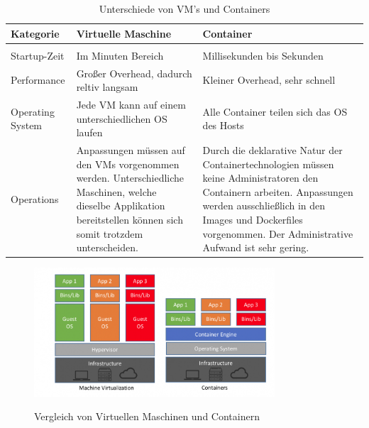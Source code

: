 \begin{table}[h]
        \centering
        \begin{tabular}{ | p{} | p{} | p{} | }
        Kategorie & Virtuelle Maschine & Container \\
        \hline \\
        Startup-Zeit & Im Minuten Bereich & Millisekunden bis Sekunden \\
        Performance & Großer Overhead, dadurch reltiv langsam & Kleiner Overhead, sehr schnell\\
        Operating System & Jede \ac{VM} kann auf einem unterschiedlichen \ac{OS} laufen & Alle Container teilen sich das \ac{OS} des Hosts \\
        Operations & Anpassungen müssen auf den \ac{VM}s vorgenommen werden. Unterschiedliche Maschinen, welche dieselbe Applikation bereitstellen können sich somit trotzdem unterscheiden. & Durch die deklarative Natur der Containertechnologien müssen keine Administratoren den Containern arbeiten. Anpassungen werden ausschließlich in den Images und Dockerfiles vorgenommen. Der Administrative Aufwand ist sehr gering. \\
        \end{tabular}
        \caption{Unterschiede von VM's und Containers}
        \label{table:comparison_vm_container}
\end{table}

\begin{figure}[h]
        \caption{Vergleich von Virtuellen Maschinen und Containern\cite{vm_vs_container}}
        \centering
        \includegraphics[width=0.8\textwidth]{bilder/comparison_vm_container.png}
        \label{fig:comparison_vm_container}
\end{figure}



